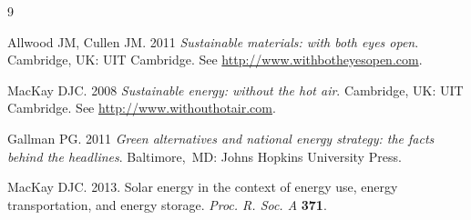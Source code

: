 \documentclass[openacc]{rstransa}%
\begin{document}
\begin{thebibliography}{9}

 Allwood JM, Cullen JM. 2011 \textit{Sustainable materials:  with both eyes open}.
Cambridge, UK: UIT Cambridge. See \href{http://www.withbotheyesopen.com}{http://www.withbotheyesopen.com}.

  MacKay DJC. 2008  \textit{Sustainable energy:  without the hot air}.
 Cambridge, UK: UIT Cambridge. See \href{http://www.withouthotair.com}{http://www.withouthotair.com}.

 Gallman PG. 2011  \textit{Green alternatives and national energy strategy: the facts
 behind the headlines}.  Baltimore,\ MD: Johns Hopkins University Press.

 MacKay DJC. 2013.  Solar energy in the context of energy use, energy transportation, and
 energy storage. \textit{Proc. R. Soc. A} \textbf{371}.

\end{thebibliography}
\end{document}
